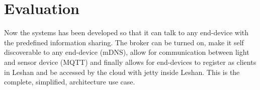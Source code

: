 \section{Evaluation}

Now the systems has been developed so that it can talk to any end-device with the predefined information sharing. The broker can be turned on, make it self discoverable to any end-device (mDNS), allow for communication between light and sensor device (MQTT) and finally allows for end-devices to register as clients in Leshan and be accessed by the cloud with jetty inside Leshan. This is the complete, simplified, architecture use case.	
